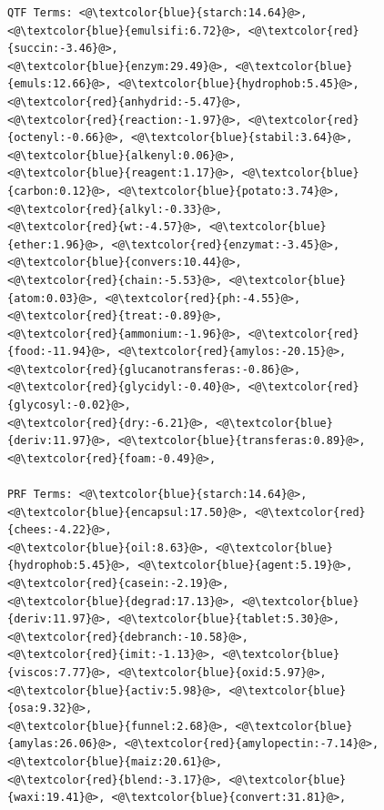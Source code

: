 \begin{figure}[t!]
\begin{framed}
\begin{lstlisting}[basicstyle=\scriptsize\ttfamily , linewidth=\columnwidth,breaklines=true]
QTF Terms: <@\textcolor{blue}{starch:14.64}@>, <@\textcolor{blue}{emulsifi:6.72}@>, <@\textcolor{red}{succin:-3.46}@>, 
<@\textcolor{blue}{enzym:29.49}@>, <@\textcolor{blue}{emuls:12.66}@>, <@\textcolor{blue}{hydrophob:5.45}@>, <@\textcolor{red}{anhydrid:-5.47}@>, 
<@\textcolor{red}{reaction:-1.97}@>, <@\textcolor{red}{octenyl:-0.66}@>, <@\textcolor{blue}{stabil:3.64}@>, <@\textcolor{blue}{alkenyl:0.06}@>, 
<@\textcolor{blue}{reagent:1.17}@>, <@\textcolor{blue}{carbon:0.12}@>, <@\textcolor{blue}{potato:3.74}@>, <@\textcolor{red}{alkyl:-0.33}@>, 
<@\textcolor{red}{wt:-4.57}@>, <@\textcolor{blue}{ether:1.96}@>, <@\textcolor{red}{enzymat:-3.45}@>, <@\textcolor{blue}{convers:10.44}@>, 
<@\textcolor{red}{chain:-5.53}@>, <@\textcolor{blue}{atom:0.03}@>, <@\textcolor{red}{ph:-4.55}@>, <@\textcolor{red}{treat:-0.89}@>, 
<@\textcolor{red}{ammonium:-1.96}@>, <@\textcolor{red}{food:-11.94}@>, <@\textcolor{red}{amylos:-20.15}@>, 
<@\textcolor{red}{glucanotransferas:-0.86}@>, <@\textcolor{red}{glycidyl:-0.40}@>, <@\textcolor{red}{glycosyl:-0.02}@>, 
<@\textcolor{red}{dry:-6.21}@>, <@\textcolor{blue}{deriv:11.97}@>, <@\textcolor{blue}{transferas:0.89}@>, <@\textcolor{red}{foam:-0.49}@>, 

PRF Terms: <@\textcolor{blue}{starch:14.64}@>, <@\textcolor{blue}{encapsul:17.50}@>, <@\textcolor{red}{chees:-4.22}@>, 
<@\textcolor{blue}{oil:8.63}@>, <@\textcolor{blue}{hydrophob:5.45}@>, <@\textcolor{blue}{agent:5.19}@>, <@\textcolor{red}{casein:-2.19}@>, 
<@\textcolor{blue}{degrad:17.13}@>, <@\textcolor{blue}{deriv:11.97}@>, <@\textcolor{blue}{tablet:5.30}@>, <@\textcolor{red}{debranch:-10.58}@>, 
<@\textcolor{red}{imit:-1.13}@>, <@\textcolor{blue}{viscos:7.77}@>, <@\textcolor{blue}{oxid:5.97}@>, <@\textcolor{blue}{activ:5.98}@>, <@\textcolor{blue}{osa:9.32}@>, 
<@\textcolor{blue}{funnel:2.68}@>, <@\textcolor{blue}{amylas:26.06}@>, <@\textcolor{red}{amylopectin:-7.14}@>, <@\textcolor{blue}{maiz:20.61}@>, 
<@\textcolor{red}{blend:-3.17}@>, <@\textcolor{blue}{waxi:19.41}@>, <@\textcolor{blue}{convert:31.81}@>, 


\end{lstlisting}
\end{framed}
\end{figure}
